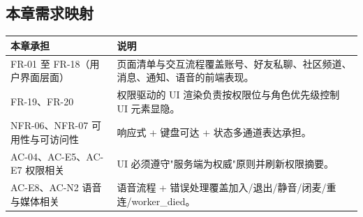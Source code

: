 \subsection{本章需求映射}
\noindent\begin{tabularx}{\textwidth}{L{3cm}Y}
  \toprule
  本章承担 & 说明 \\
  \midrule
  FR-01 至 FR-18（用户界面层面） & 页面清单与交互流程覆盖账号、好友私聊、社区频道、消息、通知、语音的前端表现。 \\
  FR-19、FR-20 & 权限驱动的 UI 渲染负责按权限位与角色优先级控制 UI 元素显隐。 \\
  NFR-06、NFR-07 可用性与可访问性 & 响应式 + 键盘可达 + 状态多通道表达承担。 \\
  AC-04、AC-E5、AC-E7 权限相关 & UI 必须遵守"服务端为权威"原则并刷新权限摘要。 \\
  AC-E8、AC-N2 语音与媒体相关 & 语音流程 + 错误处理覆盖加入/退出/静音/闭麦/重连/worker\_died。 \\
  \bottomrule
\end{tabularx}
